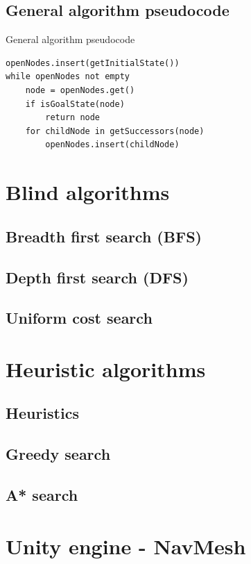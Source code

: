 \documentclass{beamer}
\begin{document}
\subsection{General algorithm pseudocode}

\begin{frame}[fragile]{General algorithm pseudocode}
\begin{lstlisting}
openNodes.insert(getInitialState())
while openNodes not empty 
	node = openNodes.get()
	if isGoalState(node)
		return node
	for childNode in getSuccessors(node)
		openNodes.insert(childNode)
\end{lstlisting}
\end{frame}

\section{Blind algorithms}

\subsection{Breadth first search (BFS)}

\subsection{Depth first search (DFS)}

\subsection{Uniform cost search}


\section{Heuristic algorithms}

\subsection{Heuristics}

\subsection{Greedy search}

\subsection{A* search}


\section{Unity engine - NavMesh}
\end{document}
